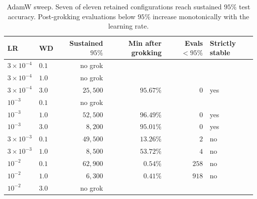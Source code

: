 \begin{table}[t]
\centering\small
\caption{AdamW sweep. Seven of eleven retained configurations reach sustained $95\%$ test
accuracy. Post-grokking evaluations below $95\%$ increase monotonically with the learning
rate.}
\label{tab:adamw-sweep}
\begin{tabular}{llrrrl}
\toprule
LR & WD & Sustained $95\%$ & Min after grokking & Evals $<95\%$ & Strictly stable \\
\midrule
$3\times10^{-4}$ & $0.1$ & no grok & & & \\
$3\times10^{-4}$ & $1.0$ & no grok & & & \\
$3\times10^{-4}$ & $3.0$ & $25{,}500$ & $95.67\%$ & $0$ & yes \\
$10^{-3}$ & $0.1$ & no grok & & & \\
$10^{-3}$ & $1.0$ & $52{,}500$ & $96.49\%$ & $0$ & yes \\
$10^{-3}$ & $3.0$ & $8{,}200$ & $95.01\%$ & $0$ & yes \\
$3\times10^{-3}$ & $0.1$ & $49{,}500$ & $13.26\%$ & $2$ & no \\
$3\times10^{-3}$ & $1.0$ & $8{,}500$ & $53.72\%$ & $4$ & no \\
$10^{-2}$ & $0.1$ & $62{,}900$ & $0.54\%$ & $258$ & no \\
$10^{-2}$ & $1.0$ & $6{,}300$ & $0.41\%$ & $918$ & no \\
$10^{-2}$ & $3.0$ & no grok & & & \\
\bottomrule
\end{tabular}
\end{table}
